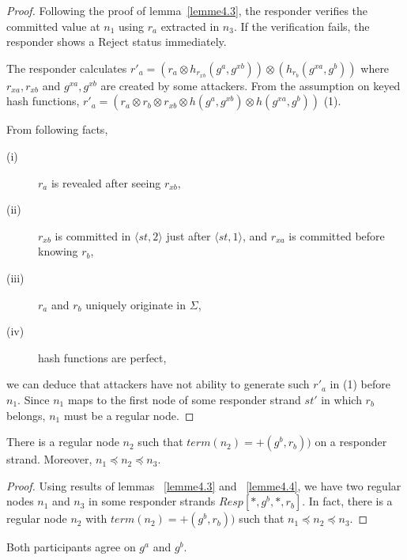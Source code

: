 \begin{proof}
Following the proof of lemma~\ref{lemme4.3}, the responder verifies the committed value at $n_1$ using $r_a$ extracted in $n_3$. If the verification fails, the responder shows a Reject status immediately. 

The responder calculates $r'_{a} = (r_a \otimes h_{r_{xb}}(g^a,g^{xb})) \otimes (h_{r_b}(g^{xa},g^b))$ where $r_{xa},r_{xb}$ and $g^{xa},g^{xb}$ are created by some attackers. 
From the assumption on keyed hash functions, $r'_{a} = (r_a \otimes r_b \otimes r_{xb} \otimes h(g^a,g^{xb}) \otimes h(g^{xa},g^b))$ (1).

From following facts,
\begin{description} 
 \item [(i)] $r_a$ is revealed after seeing $r_{xb}$, 
 \item [(ii)] $r_{xb}$ is committed in $\langle st,2 \rangle$ just after $\langle st,1 \rangle$, and $r_{xa}$ is committed before knowing $r_b$, 
 \item[(iii)] $r_a$ and $r_b$ uniquely originate in $\Sigma$, 
 \item [(iv)] hash functions are perfect,
\end{description}
we can deduce that attackers have not ability to generate such $r'_{a}$ in (1) before $n_1$. 
Since $n_1$ maps to the first node of some responder strand $st'$ in which $r_b$ belongs, $n_1$ must be a regular node. 
\end{proof}

\begin{Lemma}\label{lemme4.5}
There is a regular node $n_2$ such that $term(n_2)= + (g^b,r_b))$ on a responder strand. Moreover, $n_1 \preceq n_2 \preceq n_3$.
\end{Lemma}

\begin{proof}
Using results of lemmas ~\ref{lemme4.3} and ~\ref{lemme4.4}, we have two regular nodes $n_1$ and $n_3$ in some responder strands $Resp[*,g^b,*,r_b]$. In fact, there is a regular node $n_2$ with $term(n_2)= + (g^b,r_b))$ such that $n_1 \preceq n_2 \preceq n_3$. 
\end{proof}

\begin{Lemma}\label{lemme4.6}
Both participants agree on $g^a$ and $g^b$. 
\end{Lemma}

